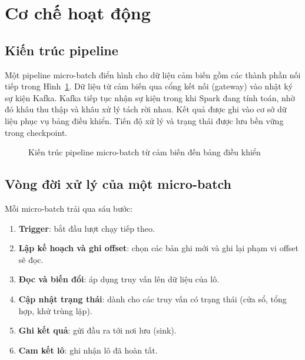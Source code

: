 \section{Cơ chế hoạt động}
\label{sec:2-mechanism}

\subsection{Kiến trúc pipeline}
\label{sec:2-pipeline}

Một pipeline micro-batch điển hình cho dữ liệu cảm biến gồm các thành phần nối tiếp trong Hình~\ref{fig:2-pipeline}. Dữ liệu từ cảm biến qua cổng kết nối (gateway) vào nhật ký sự kiện Kafka. Kafka tiếp tục nhận sự kiện trong khi Spark đang tính toán, nhờ đó khâu thu thập và khâu xử lý tách rời nhau. Kết quả được ghi vào cơ sở dữ liệu phục vụ bảng điều khiển. Tiến độ xử lý và trạng thái được lưu bền vững trong checkpoint.

\begin{figure}[H]
\centering
{}
\caption{Kiến trúc pipeline micro-batch từ cảm biến đến bảng điều khiển}
\label{fig:2-pipeline}
\end{figure}

\subsection{Vòng đời xử lý của một micro-batch}
\label{sec:2-lifecycle}

Mỗi micro-batch trải qua sáu bước:
\begin{enumerate}
  \item \textbf{Trigger}: bắt đầu lượt chạy tiếp theo.
  \item \textbf{Lập kế hoạch và ghi offset}: chọn các bản ghi mới và ghi lại phạm vi offset sẽ đọc.
  \item \textbf{Đọc và biến đổi}: áp dụng truy vấn lên dữ liệu của lô.
  \item \textbf{Cập nhật trạng thái}: dành cho các truy vấn có trạng thái (cửa sổ, tổng hợp, khử trùng lặp).
  \item \textbf{Ghi kết quả}: gửi đầu ra tới nơi lưu (sink).
  \item \textbf{Cam kết lô}: ghi nhận lô đã hoàn tất.
\end{enumerate}

